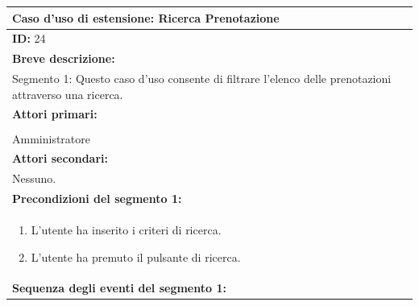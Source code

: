 \documentclass{article}
\begin{document}
                \begin{table}[H]
                    \begin{tabular}{|p{\linewidth}|}
                        \hline
                        \cellcolor{gray!100}
                        \color{white}
                        \centerline{\textbf{Caso d'uso di estensione:} Ricerca Prenotazione} \\
                        \hline
                        \textbf{ID:} 24 \\
                        \hline
                        \cellcolor{gray!20}
                        \textbf{Breve descrizione:} \\
                        \cellcolor{gray!20}
                        Segmento 1: Questo caso d'uso consente di filtrare l'elenco delle prenotazioni attraverso una ricerca. \\
                        \hline
                        \textbf{Attori primari:} \\
                        \begin{minipage}{\linewidth}
                            Biglietteria \\
                            Amministratore
                        \end{minipage}
                        \vspace{0pt} \\
                        \hline
                        \textbf{Attori secondari:} \\
                        Nessuno. \\
                        \hline
                        \cellcolor{gray!20}
                        \textbf{Precondizioni del segmento 1:} \\
                        \cellcolor{gray!20}
                        \begin{minipage}{\linewidth}
                            \begin{enumerate}
                                \item L'utente ha inserito i criteri di ricerca.
                                \item L'utente ha premuto il pulsante di ricerca.
                            \end{enumerate}
                        \end{minipage} \\
                        \hline
                        \textbf{Sequenza degli eventi del segmento 1:}

\end{tabular}
\end{table}
\end{document}
